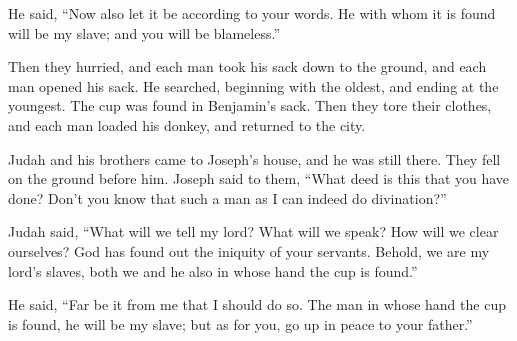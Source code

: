  He said, ``Now also let it be according to your words. He
with whom it is found will be my slave; and you will be blameless.''

 Then they hurried, and each man took his sack down to the
ground, and each man opened his sack.  He searched,
beginning with the oldest, and ending at the youngest. The cup was found
in Benjamin's sack.  Then they tore their clothes, and each
man loaded his donkey, and returned to the city.

 Judah and his brothers came to Joseph's house, and he was
still there. They fell on the ground before him.  Joseph
said to them, ``What deed is this that you have done? Don't you know
that such a man as I can indeed do divination?''

 Judah said, ``What will we tell my lord? What will we
speak? How will we clear ourselves? God has found out the iniquity of
your servants. Behold, we are my lord's slaves, both we and he also in
whose hand the cup is found.''

 He said, ``Far be it from me that I should do so. The man
in whose hand the cup is found, he will be my slave; but as for you, go
up in peace to your father.''


